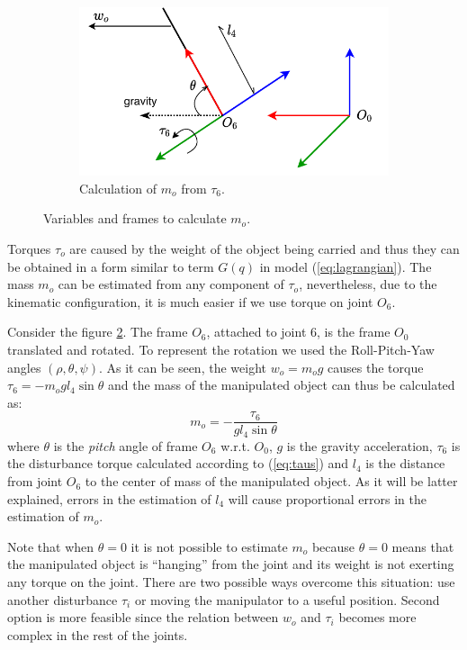 \documentclass[a4paper, 10pt]{article}
\begin{document}
\begin{figure}
\begin{subfigure}[b]{0.55\textwidth}
    \centering
    \includegraphics[width=\textwidth]{Figures/RPY.pdf}
    \caption{Calculation of $m_o$ from $\tau_6$.}
    \label{fig:rpy}
  \end{subfigure}
  \caption{Variables and frames to calculate $m_o$.}
\end{figure}

Torques $\tau_o$ are caused by the weight of the object being carried and thus they can be obtained in a form similar to term $G(q)$ in model (\ref{eq:lagrangian}). The mass $m_o$ can be estimated from any component of $\tau_o$, nevertheless, due to the kinematic configuration, it is much easier if we use torque on joint $O_6$.

Consider the figure \ref{fig:rpy}. The frame $O_6$, attached to joint 6, is the frame $O_0$ translated and rotated. To represent the rotation we used the Roll-Pitch-Yaw angles $(\rho, \theta, \psi)$. As it can be seen, the weight $w_o=m_o g$ causes the torque $\tau_6=-m_o g l_4 \sin\theta$ and the mass of the manipulated object can thus be calculated as:
\begin{equation}
  m_o = -\frac{\tau_6}{gl_4\sin\theta}
  \label{eq:mass}
\end{equation}
where $\theta$ is the \textit{pitch} angle of frame $O_6$ w.r.t. $O_0$, $g$ is the gravity acceleration, $\tau_6$ is the disturbance torque calculated according to (\ref{eq:taus}) and $l_4$ is the distance from joint $O_6$ to the center of mass of the manipulated object. As it will be latter explained, errors in the estimation of $l_4$ will cause proportional errors in the estimation of $m_o$.

Note that when $\theta=0$ it is not possible to estimate $m_o$ because $\theta=0$ means that the manipulated object is ``hanging'' from the joint and its weight is not exerting any torque on the joint. There are two possible ways overcome this situation: use another disturbance $\tau_i$ or moving the manipulator to a useful position. Second option is more feasible since the relation between $w_o$ and $\tau_i$ becomes more complex in the rest of the joints. 
\end{document}
